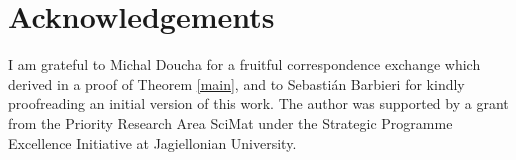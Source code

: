 \documentclass[a4paper,oneside]{amsart}
\renewcommand{\(}{\begin{dmath*}}
\renewcommand{\)}{\end{dmath*}}
\theoremstyle{definition}
\begin{document}
\section*{Acknowledgements} I am grateful to Michal Doucha for a fruitful correspondence exchange which derived in a proof of Theorem \ref{main}, and to Sebasti\'an Barbieri for kindly proofreading an initial version of this work. The author was supported by a grant from the Priority Research Area SciMat under the Strategic Programme Excellence Initiative at Jagiellonian University.


\end{document}
